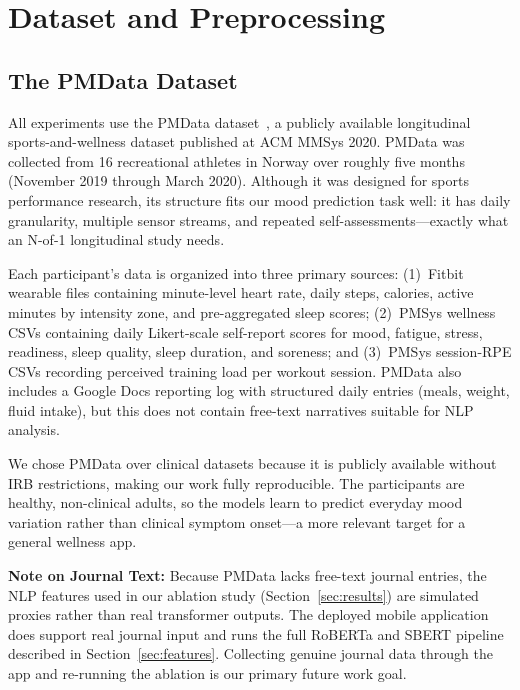 \documentclass[conference]{IEEEtran}
\begin{document}
\section{Dataset and Preprocessing}
\label{sec:dataset}

\subsection{The PMData Dataset}

All experiments use the PMData dataset~\cite{thambawita2020pmdata}, a publicly available
longitudinal sports-and-wellness dataset published at ACM MMSys 2020. PMData was collected
from 16 recreational athletes in Norway over roughly five months (November 2019 through
March 2020). Although it was designed for sports performance research, its structure fits
our mood prediction task well: it has daily granularity, multiple sensor streams, and
repeated self-assessments---exactly what an N-of-1 longitudinal study needs.

Each participant's data is organized into three primary sources:
(1)~Fitbit wearable files containing minute-level heart rate, daily steps, calories, active
minutes by intensity zone, and pre-aggregated sleep scores;
(2)~PMSys wellness CSVs containing daily Likert-scale self-report scores for mood, fatigue,
stress, readiness, sleep quality, sleep duration, and soreness; and
(3)~PMSys session-RPE CSVs recording perceived training load per workout session.
PMData also includes a Google Docs reporting log with structured daily entries
(meals, weight, fluid intake), but this does not contain free-text narratives suitable
for NLP analysis.

We chose PMData over clinical datasets because it is publicly available without
IRB restrictions, making our work fully reproducible. The participants are healthy,
non-clinical adults, so the models learn to predict everyday mood variation rather
than clinical symptom onset---a more relevant target for a general wellness app.

\textbf{Note on Journal Text:} Because PMData lacks free-text journal entries, the NLP
features used in our ablation study (Section~\ref{sec:results}) are simulated proxies
rather than real transformer outputs. The deployed mobile application does support
real journal input and runs the full RoBERTa and SBERT pipeline described in
Section~\ref{sec:features}. Collecting genuine journal data through the app and
re-running the ablation is our primary future work goal.
\end{document}
